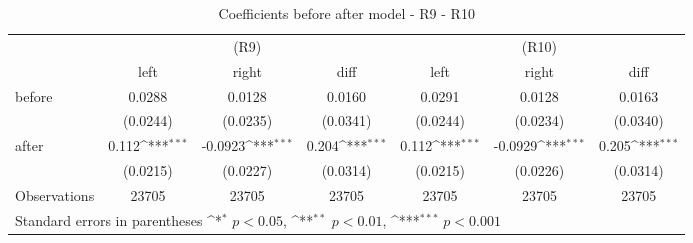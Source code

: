 \begin{table}[!ht]\centering \footnotesize
\def\sym#1{\ifmmode^{#1}\else\(^{#1}\)\fi}
\caption{Coefficients before after model - R9 - R10}
\begin{tabular}{l*{6}{c}}
\hline\hline
                    &\multicolumn{3}{c}{(R9)}&\multicolumn{3}{c}{(R10)}\\
&\multicolumn{1}{c}{left}&\multicolumn{1}{c}{right}&\multicolumn{1}{c}{diff}&\multicolumn{1}{c}{left}&\multicolumn{1}{c}{right}&\multicolumn{1}{c}{diff}\\
\hline
before              &      0.0288         &      0.0128         &      0.0160         &      0.0291         &      0.0128         &      0.0163         \\
                    &    (0.0244)         &    (0.0235)         &    (0.0341)         &    (0.0244)         &    (0.0234)         &    (0.0340)         \\
[0.5em]
after               &       0.112\sym{***}&     -0.0923\sym{***}&       0.204\sym{***}&       0.112\sym{***}&     -0.0929\sym{***}&       0.205\sym{***}\\
                    &    (0.0215)         &    (0.0227)         &    (0.0314)         &    (0.0215)         &    (0.0226)         &    (0.0314)         \\
\hline
Observations        &       23705         &       23705         &       23705         &       23705         &       23705         &       23705         \\
\hline\hline
\multicolumn{7}{l}{ Standard errors in parentheses \sym{*} \(p<0.05\), \sym{**} \(p<0.01\), \sym{***} \(p<0.001\)}\\
\end{tabular}
\end{table}
